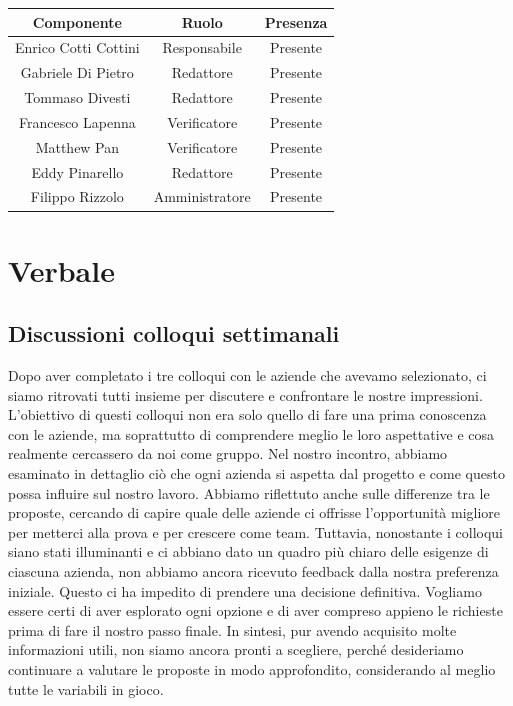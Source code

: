 \documentclass{article}
\begin{document}
\begin{tabular}{|c|c|c|}
    \hline
    \textbf{Componente} & \textbf{Ruolo} & \textbf{Presenza}\\
    \hline
    Enrico Cotti Cottini & Responsabile & Presente \\ 
    \hline
    Gabriele Di Pietro & Redattore & Presente \\ 
    \hline
    Tommaso Divesti & Redattore & Presente \\ 
    \hline %
    Francesco Lapenna & Verificatore & Presente \\ 
    \hline
    Matthew Pan & Verificatore & Presente \\ 
    \hline %
    Eddy Pinarello & Redattore & Presente \\ 
    \hline %
    Filippo Rizzolo & Amministratore & Presente \\ 
    \hline %
\end{tabular}

\newpage
\section{Verbale}

\label{sec:verbale}
\subsection{Discussioni colloqui settimanali}
{\large
Dopo aver completato i tre colloqui con le aziende che avevamo selezionato, ci siamo ritrovati tutti insieme per discutere e confrontare le nostre impressioni. L'obiettivo di questi colloqui non era solo quello di fare una prima conoscenza con le aziende, ma soprattutto di comprendere meglio le loro aspettative e cosa realmente cercassero da noi come gruppo. \newline
Nel nostro incontro, abbiamo esaminato in dettaglio ciò che ogni azienda si aspetta dal progetto e come questo possa influire sul nostro lavoro. Abbiamo riflettuto anche sulle differenze tra le proposte, cercando di capire quale delle aziende ci offrisse l'opportunità migliore per metterci alla prova e per crescere come team.\newline
Tuttavia, nonostante i colloqui siano stati illuminanti e ci abbiano dato un quadro più chiaro delle esigenze di ciascuna azienda, non abbiamo ancora ricevuto feedback dalla nostra preferenza iniziale. Questo ci ha impedito di prendere una decisione definitiva. Vogliamo essere certi di aver esplorato ogni opzione e di aver compreso appieno le richieste prima di fare il nostro passo finale.\newline
In sintesi, pur avendo acquisito molte informazioni utili, non siamo ancora pronti a scegliere, perché desideriamo continuare a valutare le proposte in modo approfondito, considerando al meglio tutte le variabili in gioco. }
\end{document}

